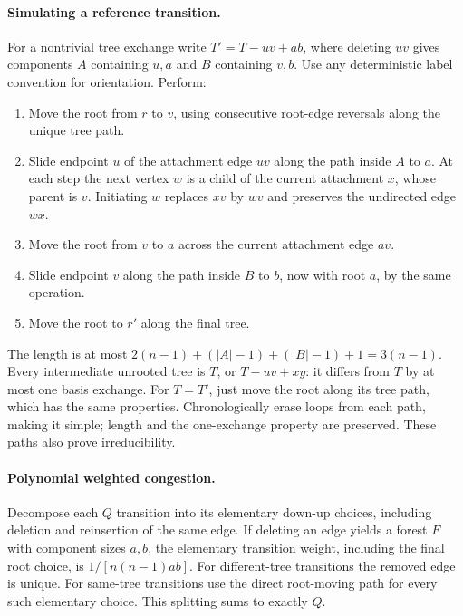 \documentclass[11pt]{article}
\begin{document}
\paragraph{Simulating a reference transition.}
For a nontrivial tree exchange write $T'=T-uv+ab$, where deleting
$uv$ gives components $A$ containing $u,a$ and $B$ containing $v,b$.
Use any deterministic label convention for orientation. Perform:
\begin{enumerate}
\item Move the root from $r$ to $v$, using consecutive root-edge
reversals along the unique tree path.
\item Slide endpoint $u$ of the attachment edge $uv$ along the path
inside $A$ to $a$. At each step the next vertex $w$ is a child of
the current attachment $x$, whose parent is $v$. Initiating $w$
replaces $xv$ by $wv$ and preserves the undirected edge $wx$.
\item Move the root from $v$ to $a$ across the current attachment
edge $av$.
\item Slide endpoint $v$ along the path inside $B$ to $b$, now
with root $a$, by the same operation.
\item Move the root to $r'$ along the final tree.
\end{enumerate}
The length is at most
$2(n-1)+(|A|-1)+(|B|-1)+1=3(n-1)$.
Every intermediate unrooted tree is $T$, or $T-uv+xy$: it differs
from $T$ by at most one basis exchange. For $T=T'$, just move the
root along its tree path, which has the same properties.
Chronologically erase loops from each path, making it simple;
length and the one-exchange property are preserved. These paths
also prove irreducibility.

\paragraph{Polynomial weighted congestion.}
Decompose each $Q$ transition into its elementary down-up choices,
including deletion and reinsertion of the same edge. If deleting an
edge yields a forest $F$ with component sizes $a,b$, the elementary
transition weight, including the final root choice, is
$1/[n(n-1)ab]$. For different-tree transitions the removed edge is
unique. For same-tree transitions use the direct root-moving path
for every such elementary choice. This splitting sums to exactly $Q$.
\end{document}
